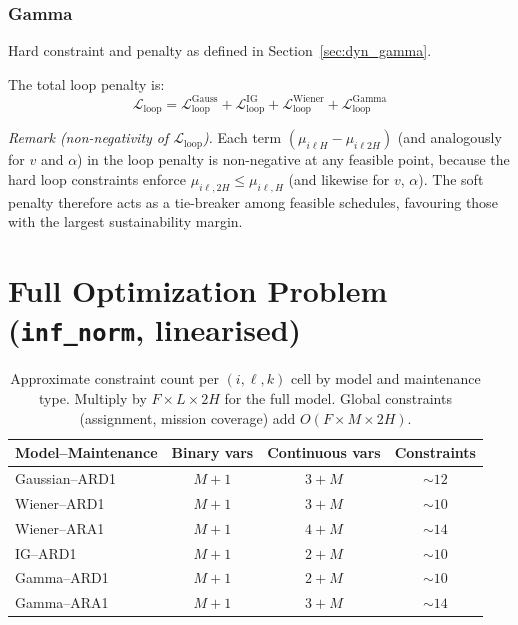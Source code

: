 \documentclass[11pt,a4paper]{article}
\begin{document}
\subsubsection{Gamma}
Hard constraint and penalty as defined in Section~\ref{sec:dyn_gamma}.

The total loop penalty is:
\begin{equation}
  \mathcal{L}_{\mathrm{loop}} =
    \mathcal{L}^{\mathrm{Gauss}}_{\mathrm{loop}}
    + \mathcal{L}^{\mathrm{IG}}_{\mathrm{loop}}
    + \mathcal{L}^{\mathrm{Wiener}}_{\mathrm{loop}}
    + \mathcal{L}^{\mathrm{Gamma}}_{\mathrm{loop}}
\end{equation}

\emph{Remark (non-negativity of $\mathcal{L}_{\mathrm{loop}}$).}
Each term $(\mu_{i\ell H} - \mu_{i\ell 2H})$ (and analogously for $v$ and $\alpha$)
in the loop penalty is non-negative at any feasible point, because the hard loop
constraints enforce $\mu_{i\ell,2H} \leq \mu_{i\ell,H}$ (and likewise for $v$, $\alpha$).
The soft penalty therefore acts as a tie-breaker among feasible schedules, favouring
those with the largest sustainability margin.

\section{Full Optimization Problem (\texttt{inf\_norm}, linearised)}
\label{sec:full_problem}
\thispagestyle{fancy}

\begin{table}[htbp]
\centering
\caption{Approximate constraint count per $(i,\ell,k)$ cell by model and maintenance type.
Multiply by $F \times L \times 2H$ for the full model.
Global constraints (assignment, mission coverage) add $O(F \times M \times 2H)$.}
\begin{tabular}{lccc}
  \toprule
  Model--Maintenance & Binary vars & Continuous vars & Constraints \\
  \midrule
  Gaussian--ARD1     & $M+1$ & $3 + M$ & $\sim 12$ \\
  Wiener--ARD1       & $M+1$ & $3 + M$ & $\sim 10$ \\
  Wiener--ARA1       & $M+1$ & $4 + M$ & $\sim 14$ \\
  IG--ARD1           & $M+1$ & $2 + M$ & $\sim 10$ \\
  Gamma--ARD1        & $M+1$ & $2 + M$ & $\sim 10$ \\
  Gamma--ARA1        & $M+1$ & $3 + M$ & $\sim 14$ \\
  \bottomrule
\end{tabular}
\label{tab:constraint_count}
\end{table}
\end{document}
